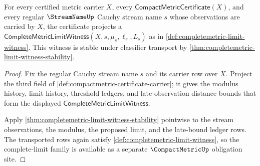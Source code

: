 \begin{theorem}
\label{thm:compactmetric-limit-family-completeness}
For every certified metric carrier $X$, every
$\mathsf{CompactMetricCertificate}(X)$, and every regular
$\StreamNameUp$ Cauchy stream name $s$ whose observations are carried by $X$,
the certificate projects a
$\mathsf{CompleteMetricLimitWitness}(X,s,\mu_s,\ell_s,L_s)$ as in
\autoref{def:completemetric-limit-witness}. This witness is stable under
classifier transport by
\autoref{thm:completemetric-limit-witness-stability}.
\end{theorem}
\begin{proof}
Fix the regular Cauchy stream name $s$ and its carrier row over $X$. Project
the third field of \autoref{def:compactmetric-certificate-carrier}; it gives
the modulus history, limit history, threshold ledgers, and late-observation
distance bounds that form the displayed
$\mathsf{CompleteMetricLimitWitness}$.

Apply \autoref{thm:completemetric-limit-witness-stability} pointwise to the
stream observations, the modulus, the proposed limit, and the late-bound
ledger rows. The transported rows again satisfy
\autoref{def:completemetric-limit-witness}, so the complete-limit family is
available as a separate $\CompactMetricUp$ obligation site.
\end{proof}

